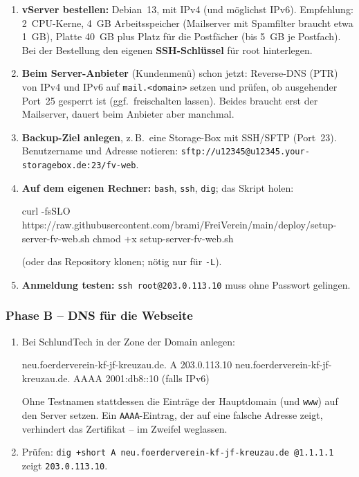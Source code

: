 \documentclass[a4paper,fontsize=10pt]{scrartcl}
\newcommand*{\cmd}[1]{\texttt{#1}}
\newcommand*{\erledigt}{\makebox[1.4em][l]{\setlength{\fboxsep}{0pt}\fbox{\rule{0pt}{0.7em}\hspace{0.7em}}}}
\begin{document}
\begin{enumerate}
  \item \erledigt\textbf{vServer bestellen:} Debian~13, mit IPv4 (und möglichst IPv6).
        Empfehlung: 2~CPU-Kerne, 4~GB Arbeitsspeicher (Mailserver mit Spamfilter
        braucht etwa 1~GB), Platte 40~GB plus Platz für die Postfächer (bis 5~GB je
        Postfach). Bei der Bestellung den eigenen \textbf{SSH-Schlüssel} für root
        hinterlegen.
  \item \erledigt\textbf{Beim Server-Anbieter} (Kundenmenü) schon jetzt:
        Reverse-DNS (PTR) von IPv4 und IPv6 auf \cmd{mail.<domain>} setzen und prüfen,
        ob ausgehender Port~25 gesperrt ist (ggf.\ freischalten lassen). Beides
        braucht erst der Mailserver, dauert beim Anbieter aber manchmal.
  \item \erledigt\textbf{Backup-Ziel anlegen}, z.\,B.\ eine Storage-Box mit SSH/SFTP
        (Port~23). Benutzername und Adresse notieren:
        \cmd{sftp://u12345@u12345.your-storagebox.de:23/fv-web}.
  \item \erledigt\textbf{Auf dem eigenen Rechner:} \cmd{bash}, \cmd{ssh}, \cmd{dig}; das
        Skript holen:
\begin{befehl}
curl -fsSLO https://raw.githubusercontent.com/brami/FreiVerein/main/deploy/setup-server-fv-web.sh
chmod +x setup-server-fv-web.sh
\end{befehl}
        (oder das Repository klonen; nötig nur für \cmd{-L}).
  \item \erledigt\textbf{Anmeldung testen:} \cmd{ssh root@203.0.113.10} muss ohne Passwort
        gelingen.
\end{enumerate}

\subsubsection*{Phase B -- DNS für die Webseite}

\begin{enumerate}[resume]
  \item \erledigt Bei SchlundTech in der Zone der Domain anlegen:
\begin{befehl}
neu.foerderverein-kf-jf-kreuzau.de.   A      203.0.113.10
neu.foerderverein-kf-jf-kreuzau.de.   AAAA   2001:db8::10      (falls IPv6)
\end{befehl}
        Ohne Testnamen stattdessen die Einträge der Hauptdomain (und \cmd{www}) auf den
        Server setzen. Ein \cmd{AAAA}-Eintrag, der auf eine falsche Adresse zeigt,
        verhindert das Zertifikat -- im Zweifel weglassen.
  \item \erledigt Prüfen: \cmd{dig +short A neu.foerderverein-kf-jf-kreuzau.de @1.1.1.1}
        zeigt \cmd{203.0.113.10}.
\end{enumerate}
\end{document}
